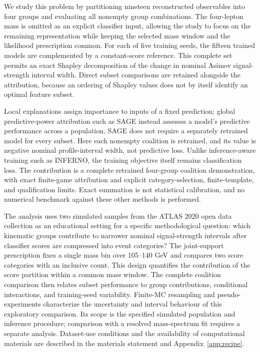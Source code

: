 \documentclass[aps,prd,reprint,superscriptaddress,nofootinbib,longbibliography,floatfix]{revtex4-2}
\begin{document}
We study this problem by partitioning nineteen reconstructed observables into
four groups and evaluating all nonempty group combinations. The four-lepton
mass is omitted as an explicit classifier input, allowing the study to focus
on the remaining representation while keeping the selected mass window and
the likelihood prescription common. For each of five training seeds, the
fifteen trained models are complemented by a constant-score reference. This
complete set permits an exact Shapley decomposition of the change in nominal
Asimov signal-strength interval width\cite{Shapley1953}. Direct subset comparisons
are retained alongside the attribution, because an ordering of Shapley values
does not by itself identify an optimal feature subset\cite{Fryer2021}.

Local explanations assign importance to inputs of a fixed prediction;
global predictive-power attribution such as SAGE instead assesses a model's
predictive performance across a population\cite{SAGE2020}. SAGE does not
require a separately retrained model for every subset. Here each nonempty
coalition is retrained, and its value is negative nominal profile-interval
width, not predictive loss. Unlike inference-aware training such as INFERNO,
the training objective itself remains classification loss. The contribution
is a complete retrained four-group coalition demonstration, with exact
finite-game attribution and explicit category-selection, finite-template,
and qualification limits. Exact summation is not statistical calibration,
and no numerical benchmark against these other methods is performed.

The analysis uses two simulated samples from the ATLAS 2020 open data
collection\cite{ATLAS2020} as an educational setting for a specific
methodological question: which kinematic groups contribute to narrower
nominal signal-strength intervals after classifier scores are compressed
into event categories? The joint-support prescription fixes a single mass
bin over 105--140 GeV and compares two score categories with an inclusive
count. This design quantifies the contribution of the score partition
within a common mass window. The complete coalition comparison then relates
subset performance to group contributions, conditional interactions, and
training-seed variability. Finite-MC resampling and pseudo-experiments
characterize the uncertainty and interval behaviour of this exploratory
comparison. Its scope is the specified simulated population and inference
procedure; comparison with a resolved mass-spectrum fit requires a separate
analysis. Dataset-use conditions and the availability of computational
materials are described in the materials statement and
Appendix~\ref{app:recipe}.
\end{document}
